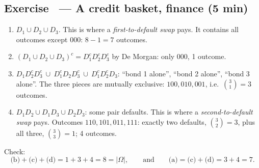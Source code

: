 \documentclass[11pt,a4paper,parskip=half]{scrartcl}
\newcommand{\Om}{\Omega}
\newcommand{\slide}[1]{\marginpar{\raggedright\footnotesize\color{gray}slide #1}}
\begin{document}
\subsection{Exercise~ --- A credit basket, finance (5 min)}\slide{33}


\begin{enumerate}[label=(\alph*)]
	\item $D_1\cup D_2\cup D_3$. This is where a \emph{first-to-default swap}
	      pays. It contains all outcomes except $000$: $8-1 = 7$ outcomes.
	\item $(D_1\cup D_2\cup D_3)^c = D_1^cD_2^cD_3^c$ by De Morgan: only $000$,
	      1 outcome.
	\item $D_1D_2^cD_3^c\ \cup\ D_1^cD_2D_3^c\ \cup\ D_1^cD_2^cD_3$: ``bond 1
	      alone'', ``bond 2 alone'', ``bond 3 alone''. The three pieces are
	      mutually exclusive: $100, 010, 001$, i.e.\ $\binom31 = 3$ outcomes.
	\item $D_1D_2\cup D_1D_3\cup D_2D_3$: some pair defaults. This is where a
	      \emph{second-to-default swap} pays. Outcomes $110, 101, 011, 111$:
	      exactly two defaults, $\binom32=3$, plus all three, $\binom33=1$;
	      4 outcomes.
\end{enumerate}
Check:
\[ \text{(b)} + \text{(c)} + \text{(d)} = 1+3+4 = 8 = |\Om|,\qquad\text{and}\qquad
	\text{(a)} = \text{(c)} + \text{(d)} = 3+4 = 7. \]
\end{document}
